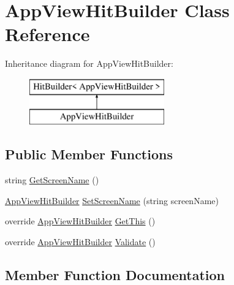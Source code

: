 \hypertarget{class_app_view_hit_builder}{}\section{App\+View\+Hit\+Builder Class Reference}
\label{class_app_view_hit_builder}
Inheritance diagram for App\+View\+Hit\+Builder\+:\begin{figure}[H]
\begin{center}
\leavevmode
\includegraphics[height=2.000000cm]{class_app_view_hit_builder}
\end{center}
\end{figure}
\subsection*{Public Member Functions}
\begin{DoxyCompactItemize}
\item 
string \hyperlink{class_app_view_hit_builder_a63d5cbbf69f65a7430b79b087e3f41c3}{Get\+Screen\+Name} ()
\item 
\hyperlink{class_app_view_hit_builder}{App\+View\+Hit\+Builder} \hyperlink{class_app_view_hit_builder_aefd5968bc04afb8fcf2512af80eaa409}{Set\+Screen\+Name} (string screen\+Name)
\item 
override \hyperlink{class_app_view_hit_builder}{App\+View\+Hit\+Builder} \hyperlink{class_app_view_hit_builder_a3480e5a885a822459f34498cdf62ca03}{Get\+This} ()
\item 
override \hyperlink{class_app_view_hit_builder}{App\+View\+Hit\+Builder} \hyperlink{class_app_view_hit_builder_a2336a0b7cb1a3179b86eb54ce6d0344f}{Validate} ()
\end{DoxyCompactItemize}


\subsection{Member Function Documentation}
\mbox{\label{class_app_view_hit_builder_a63d5cbbf69f65a7430b79b087e3f41c3}} 
